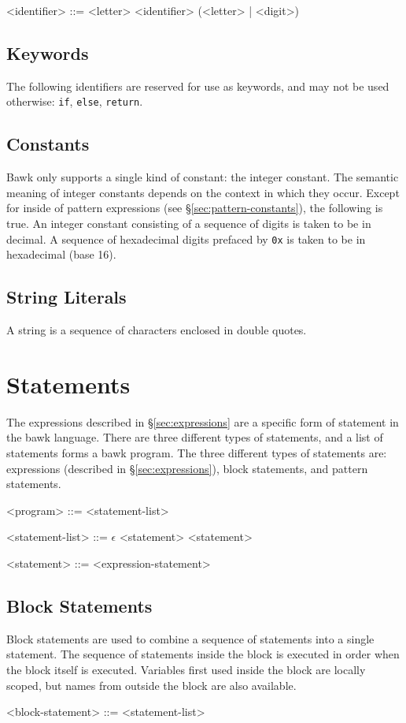 \documentclass[letterpaper]{article}
\begin{document}
\begin{grammar}
<identifier> ::= <letter>
\alt <identifier> (<letter> | <digit>)
\end{grammar}

\subsection{Keywords}
The following identifiers are reserved for use as keywords, and may not be used otherwise: \texttt{if}, \texttt{else}, \texttt{return}.

\subsection{Constants}
\label{sec:constants}
Bawk only supports a single kind of constant: the integer constant.  The semantic meaning of integer constants depends on the context in which they occur.  Except for inside of pattern expressions (see \S\ref{sec:pattern-constants}), the following is true.  An integer constant consisting of a sequence of digits is taken to be in decimal.  A sequence of hexadecimal digits prefaced by \texttt{0x} is taken to be in hexadecimal (base 16).

\subsection{String Literals}
A string is a sequence of characters enclosed in double quotes.

\section{Statements}
\label{sec:statements}
The expressions described in \S\ref{sec:expressions} are a specific form of statement in the bawk language.  There are three different types of statements, and a list of statements forms a bawk program.  The three different types of statements are: expressions (described in \S\ref{sec:expressions}), block statements, and pattern statements.
\begin{grammar}
<program> ::= <statement-list>

<statement-list> ::= $\epsilon$
\alt <statement>
 <statement>

<statement> ::= <expression-statement>
\end{grammar}

\subsection{Block Statements}
Block statements are used to combine a sequence of statements into a single statement.  The sequence of statements inside the block is executed in order when the block itself is executed.  Variables first used inside the block are locally scoped, but names from outside the block are also available.
\begin{grammar}
<block-statement> ::= <statement-list>
\end{grammar}
\end{document}
